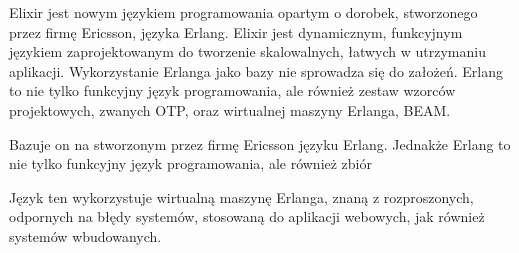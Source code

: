 Elixir jest nowym językiem programowania opartym o dorobek, stworzonego
przez firmę Ericsson, języka Erlang. Elixir jest dynamicznym, funkcyjnym
językiem zaprojektowanym do tworzenie skalowalnych, łatwych w utrzymaniu
aplikacji. Wykorzystanie Erlanga jako bazy nie sprowadza się do założeń.
Erlang to nie tylko funkcyjny język programowania, ale również zestaw
wzorców projektowych, zwanych OTP, oraz wirtualnej maszyny Erlanga,
BEAM. \cite{thomas2014}

Bazuje on na stworzonym przez firmę Ericsson języku Erlang. Jednakże
Erlang to nie tylko funkcyjny język programowania, ale również zbiór

Język ten wykorzystuje wirtualną maszynę Erlanga, znaną z rozproszonych,
odpornych na błędy systemów, stosowaną do aplikacji webowych, jak
również systemów wbudowanych.
